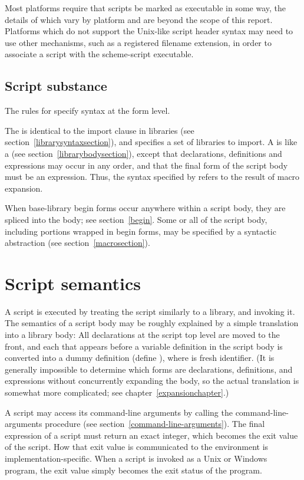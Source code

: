 Most platforms require that scripts be marked as executable in some way, 
the details of which vary by platform and are beyond the scope of this 
report. Platforms which do not support the Unix-like script header syntax 
may need to use other mechanisms, such as a registered filename extension, 
in order to associate a script with the {\cf scheme-script} executable.

\subsection{Script substance}

The rules for  specify syntax at the form level.

The  is identical to the import clause in
libraries (see section~\ref{librarysyntaxsection}), 
and specifies a set of libraries to import.  A  is like a  (see
section~\ref{librarybodysection}), except that declarations,
definitions and expressions may occur in any order, and that the final
form of the script body must be an expression.  Thus, the syntax
specified by  refers to the result of macro
expansion.

When base-library {\cf begin} forms occur anywhere within a script body,
they are spliced into the body; see section~\ref{begin}.
Some or all of the script body, including portions wrapped in {\cf begin}
forms, may be specified by a syntactic abstraction
(see section~\ref{macrosection}).

\section{Script semantics}

A script is executed by treating the script similarly to a library, and
invoking it.  The semantics of a script body may be roughly explained by
a simple translation into a library body: All declarations at the script top
level are moved to the front, and
each  that appears before a
variable definition in
the script body is converted into a dummy definition 
{\cf (define  )},
where  is fresh identifier.
(It is generally impossible to determine which forms are declarations,
definitions, and expressions without concurrently expanding the body, so
the actual translation is somewhat more complicated; see
chapter~\ref{expansionchapter}.)

A script may access its command-line arguments by calling the {\cf
  command-line-arguments} procedure (see
section~\ref{command-line-arguments}).  The final expression of a
script must return an exact integer, which becomes the exit value of
the script.  How that exit value is communicated to the environment is
implementation-specific.  When a script is invoked as a Unix or
Windows program, the exit value simply becomes the exit status of the
program.

